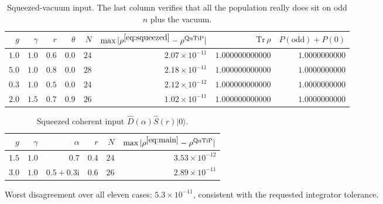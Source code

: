 \documentclass[11pt,a4paper]{article}
\newcommand{\ket}[1]{\lvert #1\rangle}
\begin{document}
\begin{table}[h]
\centering\small
\begin{tabular}{rrrrr rrr}
\toprule
$g$ & $\gamma$ & $r$ & $\theta$ & $N$
& $\max|\rho^{\eqref{eq:squeezed}}-\rho^{\rm QuTiP}|$
& $\mathrm{Tr}\,\rho$ & $P(\text{odd})+P(0)$ \\
\midrule
$1.0$ & $1.0$ & $0.6$ & $0.0$ & $24$ & $2.07\times10^{-11}$ & $1.000000000000$ & $1.0000000000$ \\
$5.0$ & $1.0$ & $0.8$ & $0.0$ & $28$ & $2.18\times10^{-11}$ & $1.000000000000$ & $1.0000000000$ \\
$0.3$ & $1.0$ & $0.5$ & $0.0$ & $24$ & $2.12\times10^{-12}$ & $1.000000000000$ & $1.0000000000$ \\
$2.0$ & $1.5$ & $0.7$ & $0.9$ & $26$ & $1.02\times10^{-11}$ & $1.000000000000$ & $1.0000000000$ \\
\bottomrule
\end{tabular}
\caption{Squeezed-vacuum input.  The last column verifies that all the
population really does sit on odd $n$ plus the vacuum.}
\label{tab:squeezed}
\end{table}

\begin{table}[h]
\centering\small
\begin{tabular}{rrrrr r}
\toprule
$g$ & $\gamma$ & $\alpha$ & $r$ & $N$
& $\max|\rho^{\eqref{eq:main}}-\rho^{\rm QuTiP}|$ \\
\midrule
$1.5$ & $1.0$ & $0.7$ & $0.4$ & $24$ & $3.53\times10^{-12}$ \\
$3.0$ & $1.0$ & $0.5+0.3\mathrm{i}$ & $0.6$ & $26$ & $2.89\times10^{-11}$ \\
\bottomrule
\end{tabular}
\caption{Squeezed coherent input $\hat D(\alpha)\hat S(r)\ket0$.}
\label{tab:sqcoh}
\end{table}

\noindent
Worst disagreement over all eleven cases: $5.3\times10^{-11}$, consistent with
the requested integrator tolerance.
\end{document}
